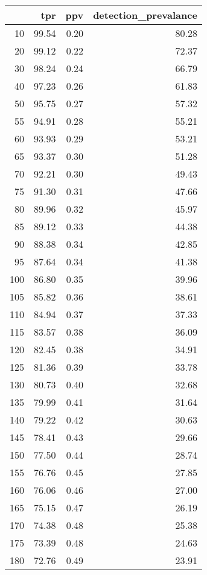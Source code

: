 \begin{table}[ht]
\centering
\begin{tabular}{rrrr}
  \hline
 & tpr & ppv & detection\_prevalance \\ 
  \hline
  10 & 99.54 & 0.20 & 80.28 \\ 
    20 & 99.12 & 0.22 & 72.37 \\ 
    30 & 98.24 & 0.24 & 66.79 \\ 
    40 & 97.23 & 0.26 & 61.83 \\ 
    50 & 95.75 & 0.27 & 57.32 \\ 
    55 & 94.91 & 0.28 & 55.21 \\ 
    60 & 93.93 & 0.29 & 53.21 \\ 
    65 & 93.37 & 0.30 & 51.28 \\ 
    70 & 92.21 & 0.30 & 49.43 \\ 
    75 & 91.30 & 0.31 & 47.66 \\ 
    80 & 89.96 & 0.32 & 45.97 \\ 
    85 & 89.12 & 0.33 & 44.38 \\ 
    90 & 88.38 & 0.34 & 42.85 \\ 
    95 & 87.64 & 0.34 & 41.38 \\ 
   100 & 86.80 & 0.35 & 39.96 \\ 
   105 & 85.82 & 0.36 & 38.61 \\ 
   110 & 84.94 & 0.37 & 37.33 \\ 
   115 & 83.57 & 0.38 & 36.09 \\ 
   120 & 82.45 & 0.38 & 34.91 \\ 
   125 & 81.36 & 0.39 & 33.78 \\ 
   130 & 80.73 & 0.40 & 32.68 \\ 
   135 & 79.99 & 0.41 & 31.64 \\ 
   140 & 79.22 & 0.42 & 30.63 \\ 
   145 & 78.41 & 0.43 & 29.66 \\ 
   150 & 77.50 & 0.44 & 28.74 \\ 
   155 & 76.76 & 0.45 & 27.85 \\ 
   160 & 76.06 & 0.46 & 27.00 \\ 
   165 & 75.15 & 0.47 & 26.19 \\ 
   170 & 74.38 & 0.48 & 25.38 \\ 
   175 & 73.39 & 0.48 & 24.63 \\ 
   180 & 72.76 & 0.49 & 23.91 \\ 

\end{tabular}
\end{table}
